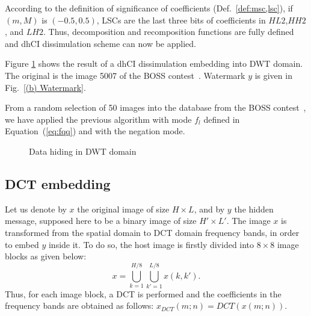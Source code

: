 \documentclass{comjnl}
\begin{document}
According to the definition of significance of coefficients 
(Def.~\ref{def:msc,lsc}), if $(m,M)$ is $(-0.5,0.5)$,  LSCs are the
last three bits of coefficients in 
$\textit{HL}2$,$\textit{HH}2$, and $\textit{LH}2$.
Thus, decomposition and recomposition functions are fully defined
and dhCI dissimulation scheme can now be applied.

Figure \ref{fig:DWT} shows the result of a
dhCI dissimulation embedding into DWT domain. 
The original is the image 5007 of the BOSS contest~\cite{Boss10}.
Watermark $y$ is given in Fig.~\ref{(b) Watermark}.


From a random selection of 50 images into the database from the BOSS 
contest~\cite{Boss10}, we have applied the previous algorithm with mode $f_l$ 
defined in Equation~(\ref{eq:fqq}) and with the negation mode. 

\begin{figure}[ht]
  \centering
{}\hspace{1cm}

\hspace{1cm}


\caption{Data hiding in DWT domain}
\label{fig:DWT}
\end{figure}





\subsection{DCT embedding}
Let us denote by $x$ the original image of size $H \times L$, and by $y$
the hidden message, supposed here to be a binary image of size $H' \times L'$. The image $x$ is transformed from the spatial
domain to DCT domain frequency bands,
in order to embed $y$ inside it.  
To do so, the host image is firstly divided into $8 \times 8$
image blocks as given below:
$$x = \bigcup_{k=1}^{H/8} \bigcup_{k'=1}^{L/8} x(k,k').$$
Thus, for each image block,
a DCT is performed and the coefficients in the frequency bands 
are obtained as follows:
$x_{DCT}(m;n) = DCT(x(m;n))$.
\end{document}
